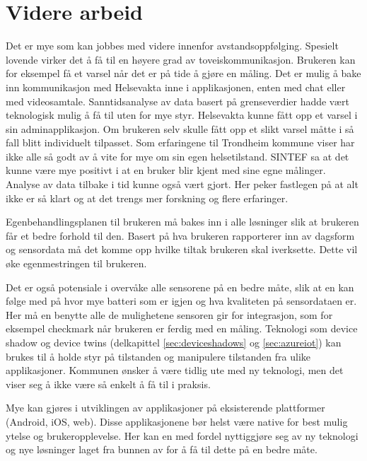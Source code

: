 \section{Videre arbeid}
Det er mye som kan jobbes med videre innenfor avstandsoppfølging. Spesielt lovende virker det å få til
en høyere grad av toveiskommunikasjon. Brukeren kan for eksempel få et varsel når det er på tide å gjøre en måling.
Det er mulig å bake inn kommunikasjon med Helsevakta inne i applikasjonen, enten med chat eller med videosamtale.
Sanntidsanalyse av data basert på grenseverdier hadde vært teknologisk mulig å få til uten for mye styr. Helsevakta
kunne fått opp et varsel i sin adminapplikasjon. Om brukeren selv skulle fått opp et slikt varsel måtte i så fall blitt
individuelt tilpasset.
Som erfaringene til Trondheim kommune viser har ikke alle så godt av å vite for mye om sin egen
helsetilstand. SINTEF sa at det kunne være mye positivt i at en bruker blir kjent med sine egne målinger.
Analyse av data tilbake i tid kunne også vært gjort. Her peker fastlegen på at alt ikke er så klart og
at det trengs mer forskning og flere erfaringer.

Egenbehandlingsplanen til brukeren må bakes inn i alle løsninger slik at brukeren får et bedre forhold til den.
Basert på hva brukeren rapporterer inn av dagsform og sensordata må det komme opp hvilke tiltak brukeren skal
iverksette. Dette vil øke egenmestringen til brukeren.

Det er også potensiale i overvåke alle sensorene på en bedre måte, slik at en kan følge med på hvor mye batteri som er igjen
og hva kvaliteten på sensordataen er. Her må en benytte alle de mulighetene sensoren gir for integrasjon, som for eksempel
checkmark når brukeren er ferdig med en måling. Teknologi som device shadow og device twins (delkapittel \ref{sec:deviceshadows}
og \ref{sec:azureiot}) kan brukes til å holde styr på tilstanden og manipulere tilstanden fra ulike applikasjoner.
Kommunen ønsker å være tidlig ute med
ny teknologi, men det viser seg å ikke være så enkelt å få til i praksis.

Mye kan gjøres i utviklingen av applikasjoner på eksisterende plattformer (Android, iOS, web). Disse applikasjonene bør helst være native for best
mulig ytelse og brukeropplevelse. Her kan en med fordel nyttiggjøre seg av ny teknologi og nye løsninger laget fra bunnen av for å få til dette på en bedre måte.
